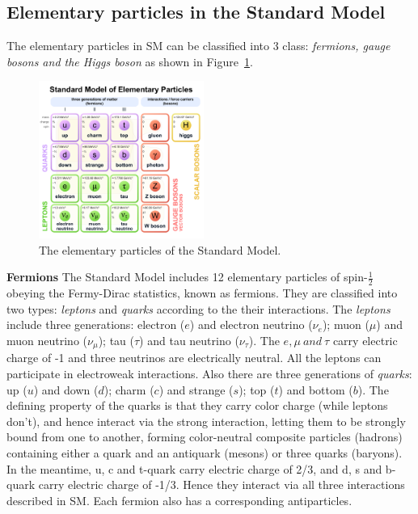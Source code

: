 \subsection{Elementary particles in the Standard Model}
\label{elementaryparticles}

The elementary particles in SM can be classified into 3 class: \textit{fermions, gauge bosons and the Higgs boson} as shown in Figure~\ref{fig:eleP-1}.
\begin{figure}[!htb]
  \centering
  \includegraphics[width=0.48\textwidth]{figures/Theory/Standard_Model_of_Elementary_Particles.pdf}
  \caption{The elementary particles of the Standard Model.}
  \label{fig:eleP-1}
\end{figure}

\textbf{Fermions}
The Standard Model includes 12 elementary particles of spin-$\frac{1}{2}$ obeying the Fermy-Dirac statistics, known as fermions. 
They are classified into two types: \textit{leptons} and \textit{quarks} according to the their interactions.
The \textit{leptons} include three generations: electron ($e$) and electron neutrino ($\nu_{e}$); 
muon ($\mu$) and muon neutrino ($\nu_{\mu}$); tau ($\tau$) and tau neutrino ($\nu_{\tau}$).
The $e, \mu~and~\tau$ carry electric charge of -1 and three neutrinos are electrically neutral. 
All the leptons can participate in electroweak interactions.
Also there are three generations of \textit{quarks}: up ($u$) and down ($d$); charm ($c$) and strange ($s$); top ($t$) and bottom ($b$).
The defining property of the quarks is that they carry color charge (while leptons don't), and hence interact via the strong interaction, 
letting them to be strongly bound from one to another, forming color-neutral composite 
particles (hadrons) containing either a quark and an antiquark (mesons) or three quarks (baryons).
In the meantime, u, c and t-quark carry electric charge of 2/3, and d, s and b-quark carry electric charge of -1/3. 
Hence they interact via all three interactions described in SM.
Each fermion also has a corresponding antiparticles.

